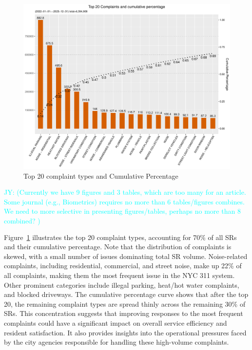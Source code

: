 \documentclass[linenumber]{jdsart}
\newcommand{\jy}[1]{\textcolor{cyan}{JY: (#1)}}
\begin{document}
\begin{figure}[tbp]
 \centering
  \includegraphics[width = \textwidth]{SR_by_Complaint_Type.pdf} 
  \caption{Top 20 complaint types and Cumulative Percentage} 
  \label{fig:SR_complaints}
\end{figure}

\jy{Currently we have 9 figures and 3 tables, which are too many for
  an article. Some journal (e.g., Biometrics) requires no more than 6
  tables/figures combines. We need to more selective in presenting
  figures/tables, perhaps no more than 8 combined?
}

Figure~\ref{fig:SR_complaints}
illustrates the top 20 complaint types, accounting for 70\% 
of all SRs and their cumulative percentage. Note that the 
distribution of complaints is skewed, with a small number of issues 
dominating total SR volume. Noise-related complaints, including 
residential, commercial, and street noise, make up 22\% of all 
complaints, making them the most frequent issue in the NYC 311 system. 
Other prominent categories include illegal parking, heat/hot water 
complaints, and blocked driveways. The cumulative percentage curve 
shows that after the top 20, the remaining complaint types are spread 
thinly across the remaining 30\% of SRs. This concentration suggests 
that improving responses to the most frequent complaints could have 
a significant impact on overall service efficiency and resident 
satisfaction. It also provides insights into the operational 
pressures faced by the city agencies responsible for handling these 
high-volume complaints.
\end{document}

